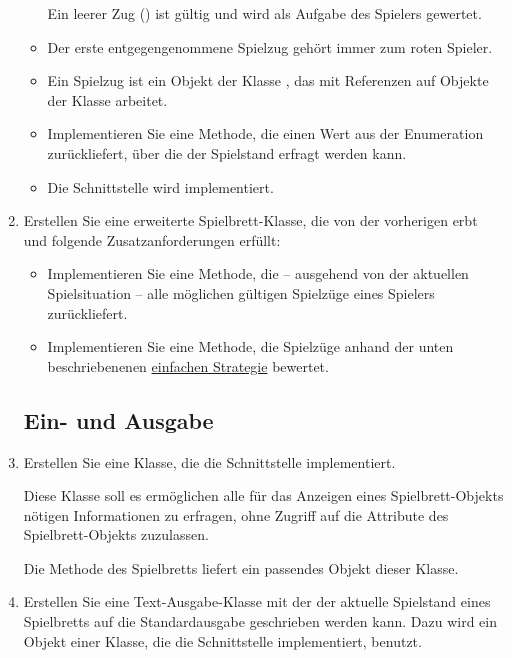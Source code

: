 \begin{enumerate}
\begin{itemize}
Ein leerer Zug () ist gültig und wird als Aufgabe des Spielers gewertet.
\item Der erste entgegengenommene Spielzug gehört immer zum roten Spieler.
\item Ein Spielzug ist ein Objekt der Klasse , das mit Referenzen auf Objekte der Klasse  arbeitet.

\item Implementieren Sie eine Methode, die einen Wert aus der Enumeration\\  zurückliefert, über die der Spielstand erfragt werden kann.

\item Die Schnittstelle  wird implementiert.
\end{itemize}

\item Erstellen Sie eine erweiterte Spielbrett-Klasse, die von der vorherigen erbt und folgende Zusatzanforderungen erfüllt:

\begin{itemize}
\item Implementieren Sie eine Methode, die -- ausgehend von der aktuellen Spielsituation -- alle möglichen gültigen Spielzüge eines Spielers zurückliefert.

\item Implementieren Sie eine Methode, die Spielzüge anhand der unten beschriebenenen \hyperlink{strategy}{einfachen Strategie} bewertet.
\end{itemize}

\subsection*{Ein- und Ausgabe}

\item Erstellen Sie eine Klasse, die die Schnittstelle  implementiert.

Diese Klasse soll es ermöglichen alle für das Anzeigen eines Spielbrett-Objekts nötigen Informationen zu erfragen, ohne Zugriff auf die Attribute des Spielbrett-Objekts zuzulassen.

Die Methode  des Spielbretts liefert ein passendes Objekt dieser Klasse.

\item Erstellen Sie eine Text-Ausgabe-Klasse mit der der aktuelle Spielstand eines Spielbretts auf die Standardausgabe geschrieben werden kann. Dazu wird ein Objekt einer Klasse, die die Schnittstelle  implementiert, benutzt.


\end{enumerate}
